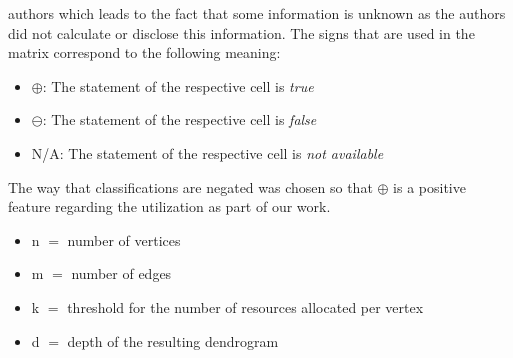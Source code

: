 \documentclass[12pt,a4paper]{report}
\begin{document}
\begin{table}[ht!]
{  authors which leads to the fact that some information is unknown as
  the authors did not calculate or disclose this information.
  The signs that are used in the matrix correspond to the following meaning:
  \begin{itemize}[noitemsep]
    \item $\oplus$: The statement of the respective cell is \textit{true}
    \item $\ominus$: The statement of the respective cell is \textit{false}
    \item N/A: The statement of the respective cell is \textit{not available}
  \end{itemize}
  The way that classifications are negated was chosen so that $\oplus$
  is a positive feature regarding the utilization as part of our work.
  \newline
  \scriptsize
  \begin{itemize}[noitemsep]
      \item n $=$ number of vertices
      \item m $=$ number of edges
      \item k $=$ threshold for the number of resources allocated per vertex
      \item d $=$ depth of the resulting dendrogram
  \end{itemize}
  \normalsize
}
\label{table:graph-clustering-survey}
\end{table}
\end{document}
